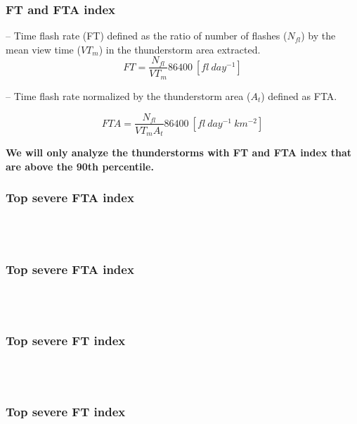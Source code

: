 \documentclass[smaller]{beamer}
\begin{document}
\begin{frame}
\frametitle{FT and FTA index}

-- Time flash rate (FT) defined as the ratio of number of flashes ($N_{fl}$) by the mean view time ($VT_m$) in the thunderstorm area extracted.	
\begin{equation}
FT = \frac{N_{fl} }{VT_m} 86400 ~[fl~day^{-1}]    
\end{equation}

-- Time flash rate normalized by the thunderstorm area ($A_t$) defined as FTA. 

\begin{equation}
FTA = \frac{N_{fl} }{VT_m A_t } 86400 ~[fl~day^{-1}~km^{-2}]
\end{equation}

\bigskip
\textbf{We will only analyze the thunderstorms with FT and FTA index that are above the 90th percentile.} 

\end{frame}

\begin{frame}
\frametitle{Top severe FTA index}
~~
\\
\\

\end{frame}


\begin{frame}
\frametitle{Top severe FTA index}
~~
\\
\\

\end{frame}


\begin{frame}
\frametitle{Top severe FT index}

~~
\\
\\

\end{frame}

\begin{frame}
\frametitle{Top severe FT index}
~~
\\
\\

\end{frame}
\end{document}
